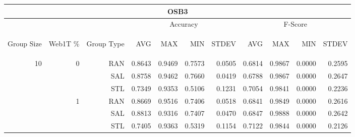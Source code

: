 \begin{center}
\begin{table}[htbp]
\begin{tabular}{ | r | r | r | r | r | r | r | r | r | r | r |}
\hline
\multicolumn{11}{|c|}{OSB3}\\
\hline
 & & & \multicolumn{4}{|c|}{Accuracy} & \multicolumn{4}{|c|}{F-Score}\\ \cline{4-11}
\begin{sideways}Group Size\end{sideways} & \begin{sideways}Web1T \%\end{sideways} & \begin{sideways}Group Type\end{sideways} & \begin{sideways}AVG\end{sideways} & \begin{sideways}MAX\end{sideways} & \begin{sideways}MIN\end{sideways} & \begin{sideways}STDEV\end{sideways} & \begin{sideways}AVG\end{sideways} & \begin{sideways}MAX\end{sideways} & \begin{sideways}MIN\end{sideways} & \begin{sideways}STDEV\end{sideways}\\
\hline
\multirow{15}{*}{10}
 & \multirow{3}{*}{0} & RAN & 0.8643 & 0.9469 & 0.7573 & 0.0505 & 0.6814 & 0.9867 & 0.0000 & 0.2595\\ \cline{3-11}
 &   & SAL & 0.8758 & 0.9462 & 0.7660 & 0.0419 & 0.6788 & 0.9867 & 0.0000 & 0.2647\\ \cline{3-11}
 &   & STL & 0.7349 & 0.9353 & 0.5106 & 0.1231 & 0.7054 & 0.9841 & 0.0000 & 0.2236\\ \cline{2-11}
 & \multirow{3}{*}{1} & RAN & 0.8669 & 0.9516 & 0.7406 & 0.0518 & 0.6841 & 0.9849 & 0.0000 & 0.2616\\ \cline{3-11}
 &   & SAL & 0.8813 & 0.9316 & 0.7407 & 0.0470 & 0.6847 & 0.9888 & 0.0000 & 0.2642\\ \cline{3-11}
 &   & STL & 0.7405 & 0.9363 & 0.5319 & 0.1154 & 0.7122 & 0.9844 & 0.0000 & 0.2126\\ \cline{2-11}

\end{tabular}
\end{table}
\end{center}
